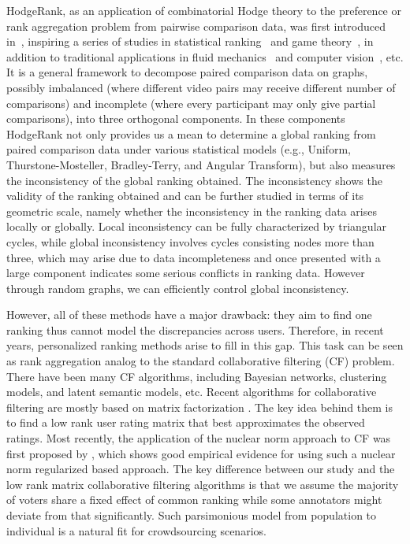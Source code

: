 \documentclass[10pt,journal,cspaper,compsoc]{IEEEtran}
\begin{document}
HodgeRank, as an application of combinatorial Hodge theory to the preference or rank aggregation problem from pairwise comparison data, was first introduced in~\cite{Hodge}, inspiring a series of studies in statistical ranking~\cite{hodge_l1,osting2013enhanced} and game theory~\cite{Parrilo11_gameflow}, in addition to traditional applications in fluid mechanics~\cite{Chorin93} and computer vision~\cite{Yuan09_hodge}, {etc}. It is a general framework to decompose paired comparison data on graphs, possibly imbalanced (where different video pairs may receive different number of comparisons) and incomplete (where every participant may only give partial comparisons), into three orthogonal components. In these components HodgeRank not only provides us a mean to determine a global ranking from paired comparison data under various statistical models (e.g., Uniform, Thurstone-Mosteller, Bradley-Terry, and Angular Transform), but also measures the inconsistency of the global ranking obtained. The inconsistency shows the validity of the ranking obtained and can be further studied in terms of its geometric scale, namely whether the inconsistency in the ranking data arises locally or globally. Local inconsistency can be fully characterized by triangular cycles, while global inconsistency involves cycles consisting nodes more than three, which may arise due to data incompleteness and once presented with a large component indicates some serious conflicts in ranking data. However through random graphs, we can efficiently control global inconsistency.

However, all of these methods have a major drawback: they aim to find one
ranking thus cannot
model the discrepancies across users. Therefore, in recent years, personalized ranking methods arise to fill in this gap.
This task can be seen as rank aggregation
analog to the standard collaborative filtering (CF) problem.
There
have been many CF algorithms, including Bayesian networks,
clustering models, and latent semantic models, etc. Recent algorithms
 for collaborative filtering are mostly based on matrix factorization \cite{salakhutdinov2008bayesian,rennie2005fast}.
  The key idea behind them is to find a low rank user rating matrix that best approximates the observed ratings. Most recently, the application of the nuclear norm approach to CF was first proposed by \cite{yi2013inferring}, which shows good empirical evidence for using such a nuclear
norm regularized based approach. The key difference between our
study and the low rank matrix collaborative filtering algorithms is that we assume the majority of voters share a fixed effect of common ranking while some annotators might deviate from that significantly. Such parsimonious model from population to individual is a natural fit for crowdsourcing scenarios.
\end{document}

